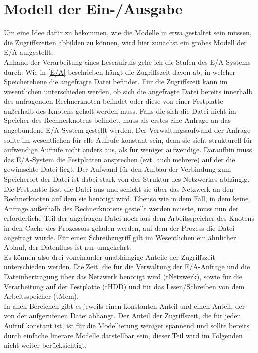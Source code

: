 \documentclass[
	12pt,
	a4paper,
	BCOR10mm,
	DIV14,
	listof=totoc,
	bibliography=totoc,
	headsepline
]{scrreprt}
\begin{document}
\section{Modell der Ein-/Ausgabe}
\label{ea_modell}
Um eine Idee dafür zu bekommen, wie die Modelle in etwa gestaltet sein müssen, die Zugriffszeiten abbilden zu können, wird hier zunächst ein grobes Modell der E/A aufgestellt.\\
Anhand der Verarbeitung eines Leseaufrufs gehe ich die Stufen des E/A-Systems durch. Wie in \ref{E/A} beschrieben hängt die Zugriffszeit davon ab, in welcher Speicherebene die angefragte Datei befindet. Für die Zugriffszeit kann im wesentlichen unterschieden werden, ob sich die angefragte Datei bereits innerhalb des anfragenden Rechnerknoten befindet oder diese von einer Festplatte außerhalb des Knotens geholt werden muss.
Falls die sich die Datei nicht im Speicher des Rechnerknotens befindet, muss als erstes eine Anfrage an das angebundene E/A-System gestellt werden. Der Verwaltungsaufwand der Anfrage sollte im wesentlichen für alle Aufrufe konstant sein, denn sie sieht strukturell für aufwendige Aufrufe nicht anders aus, als für weniger aufwendige.
Daraufhin muss das E/A-System die Festplatten ansprechen (evt. auch mehrere) auf der die gewünschte Datei liegt. Der Aufwand für den Aufbau der Verbindung zum Speicherort der Datei ist dabei stark von der Struktur des Netzwerkes abhängig. Die Festplatte liest die Datei aus und schickt sie über das Netzwerk an den Rechnerknoten auf dem sie benötigt wird.
Ebenso wie in dem Fall, in dem keine Anfrage außerhalb des Rechnerknotens gestellt werden musste, muss nun der erforderliche Teil der angefragen Datei noch aus dem Arbeitsspeicher des Knotens in den Cache des Prozessors geladen werden, auf dem der Prozess die Datei angefragt wurde. Für einen Schreibzugriff gilt im Wesentlichen ein ähnlicher Ablauf, der Datenfluss ist nur umgekehrt.\\
Es können also drei voneinander unabhängige Anteile der Zugriffszeit unterschieden werden. Die Zeit, die für die Verwaltung der E/A-Anfrage und die Dateiübertragung über das Netzwerk benötigt wird (tNetzwerk), sowie für die Verarbeitung auf der Festplatte (tHDD) und für das Lesen/Schreiben von dem Arbeitsspeicher (tMem).\\
In allen Bereichen gibt es jeweils einen konstanten Anteil und einen Anteil, der von der aufgerufenen Datei abhängt. 
Der Anteil der Zugriffszeit, die für jeden Aufruf konstant ist, ist für die Modellierung weniger spannend und sollte bereits durch einfache linerare Modelle darstellbar sein, dieser Teil wird im Folgenden nicht weiter berücksichtigt.
\end{document}
